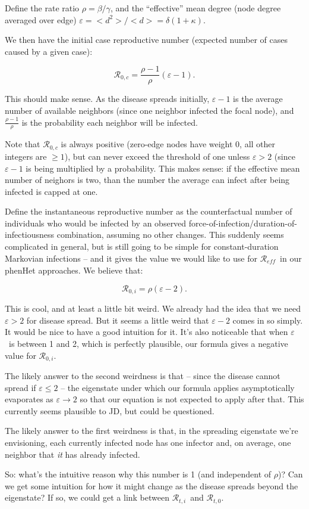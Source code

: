 \documentclass[12pt]{article}
\begin{document}
\newcommand{\Rx}[1]{\ensuremath{\mathcal{R}_{#1}}}
\newcommand{\emd}{\ensuremath{\varepsilon}}

Define the rate ratio $\rho = \beta/\gamma$, and the “effective” mean degree (node degree averaged over edge) $\varepsilon = <d^2>/<d> = \delta(1+
\kappa)$.

We then have the initial case reproductive number (expected number of cases caused by a given case):

$$ \Rx{0,c} = \frac{\rho-1}{\rho}(\emd-1). $$

This should make sense. As the disease spreads initially, $\emd - 1$ is the average number of available neighbors (since one neighbor infected the focal node), and $\frac{\rho-1}{\rho}$ is the probability each neighbor will be infected. 

Note that \Rx{0,c} is always positive (zero-edge nodes have weight 0, all other integers are $\geq1$), but can never exceed the threshold of one unless $\emd>2$ (since $\emd-1$ is being multiplied by a probability. This makes sense: if the effective mean number of neighors is two, than the number the average can infect after being infected is capped at one.

Define the instantaneous reproductive number as the counterfactual number of individuals who would be infected by an observed force-of-infection/duration-of-infectiousness combination, assuming no other changes. This suddenly seems complicated in general, but is still going to be simple for constant-duration Markovian infections -- and it gives the value we would like to use for \Rx{\mathit{eff}}\ in our phenHet approaches. We believe that:

$$ \Rx{0,i} = \rho(\emd-2).$$

This is cool, and at least a little bit weird. We already had the idea that we need $\emd>2$ for disease spread. But it seems a little weird that $\emd-2$ comes in so simply. It would be nice to have a good intuition for it. It's also noticeable that when \emd\ is between 1 and 2, which is perfectly plausible, our formula gives a negative value for \Rx{0,i}.

The likely answer to the second weirdness is that -- since the disease cannot spread if $\emd\leq2$ -- the eigenstate under which our formula applies asymptotically evaporates as $\emd\to2$ so that our equation is not expected to apply after that. This currently seems plausible to JD, but could be questioned.

The likely answer to the first weirdness is that, in the spreading eigenstate we're envisioning, each currently infected node has one infector and, on average, one neighbor that \emph{it} has already infected.

So: what's the intuitive reason why this number is 1 (and independent of $\rho$)? Can we get some intuition for how it might change as the disease spreads beyond the eigenstate? If so, we could get a link between \Rx{t,i}\ and \Rx{t,0}.
\end{document}
